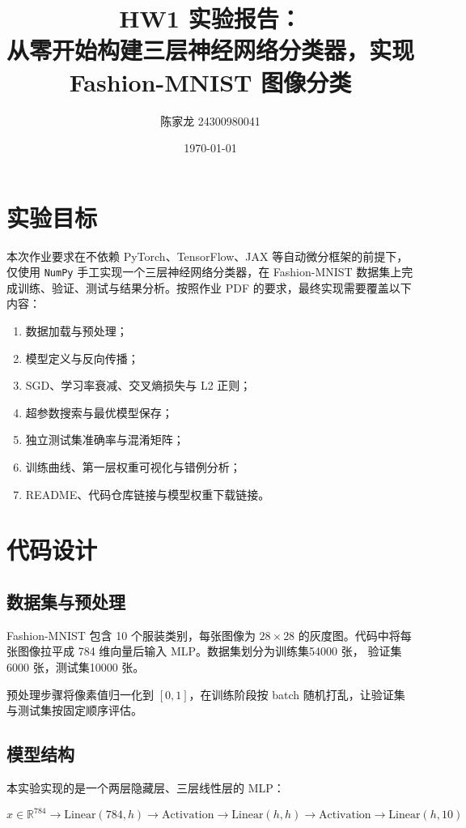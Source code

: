 \documentclass[UTF8,a4paper,12pt]{ctexart}
\title{HW1 实验报告：\\从零开始构建三层神经网络分类器，实现 Fashion-MNIST 图像分类}
\date{\today}
\author{陈家龙 24300980041}
\begin{document}
\maketitle

\section{实验目标}

本次作业要求在不依赖 PyTorch、TensorFlow、JAX 等自动微分框架的前提下，仅使用 \texttt{NumPy} 手工实现一个三层神经网络分类器，在 Fashion-MNIST 数据集上完成训练、验证、测试与结果分析。按照作业 PDF 的要求，最终实现需要覆盖以下内容：

\begin{enumerate}
    \item 数据加载与预处理；
    \item 模型定义与反向传播；
    \item SGD、学习率衰减、交叉熵损失与 L2 正则；
    \item 超参数搜索与最优模型保存；
    \item 独立测试集准确率与混淆矩阵；
    \item 训练曲线、第一层权重可视化与错例分析；
    \item README、代码仓库链接与模型权重下载链接。
\end{enumerate}

\section{代码设计}

\subsection{数据集与预处理}

Fashion-MNIST 包含 10 个服装类别，每张图像为 $28 \times 28$ 的灰度图。代码中将每张图像拉平成 784 维向量后输入 MLP。数据集划分为训练集54000 张，
验证集6000 张，测试集10000 张。

预处理步骤将像素值归一化到 $[0,1]$，在训练阶段按 batch 随机打乱，让验证集与测试集按固定顺序评估。

\subsection{模型结构}

本实验实现的是一个两层隐藏层、三层线性层的 MLP：

\begin{equation}
    x \in \mathbb{R}^{784}
    \rightarrow \text{Linear}(784, h)
    \rightarrow \text{Activation}
    \rightarrow \text{Linear}(h, h)
    \rightarrow \text{Activation}
    \rightarrow \text{Linear}(h, 10)
\end{equation}
\end{document}
